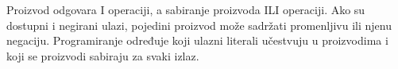 Proizvod odgovara I operaciji, a sabiranje proizvoda ILI operaciji. Ako su dostupni i negirani ulazi, pojedini proizvod može sadržati promenljivu ili njenu negaciju. Programiranje određuje koji ulazni literali učestvuju u proizvodima i koji se proizvodi sabiraju za svaki izlaz.
